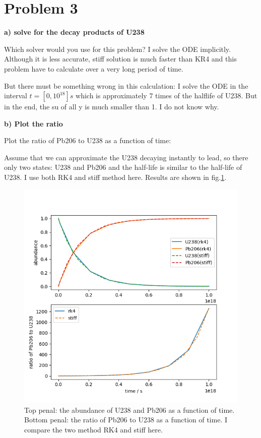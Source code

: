 \documentclass[showpacs, oneside, onecolumn, prl, amsmath, amssymb, nofootinbib, superscriptaddress, notitlepage]{revtex4-1}
\newcommand\bfig{\begin{figure}}
\newcommand\efig{\end{figure}}
\begin{document}
\section{Problem 3}

\textbf{a) solve for the decay products of U238}

Which solver would you use for this problem?
I solve the ODE implicitly. Although it is less accurate, stiff solution is much faster than KR4 and this problem have to calculate over a very long period of time.

But there must be something wrong in this calculation: I solve the ODE in the interval $t=[0,10^{18}]s$ which is approximately 7 times of the halflife of U238. But in the end, the su of all y is much smaller than 1. I do not know why.


\textbf{b) Plot the ratio}

Plot the ratio of Pb206 to U238 as a function of time:

Assume that we can approximate the U238 decaying instantly to lead, so there only two states: U238 and Pb206 and the half-life is similar to the half-life of U238. I use both RK4 and stiff method here. Results are shown in fig.\ref{2-3-1}.

\bfig
	\centering
	\includegraphics[scale=1]{2-3-1.png}
	\caption{Top penal: the abundance of U238 and Pb206 as a function of time. Bottom penal: the ratio of Pb206 to U238 as a function of time. I compare the two method RK4 and stiff here.}
	\label{2-3-1}
\efig
\end{document}

